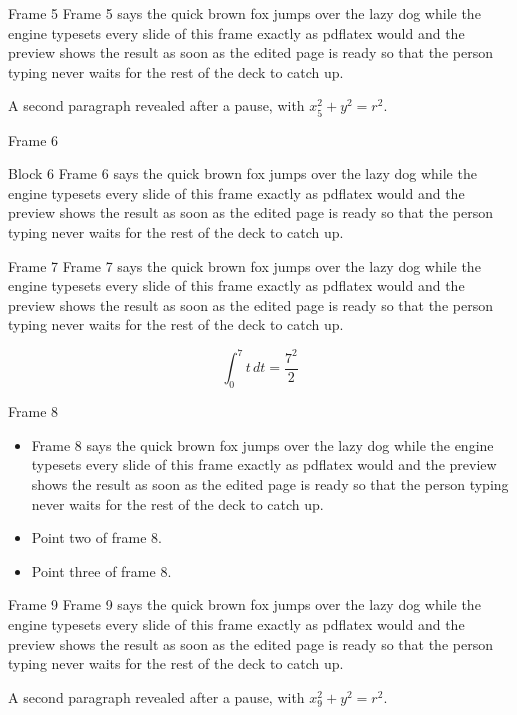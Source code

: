 \documentclass{beamer}
\begin{document}
\begin{frame}{Frame 5}
  Frame 5 says the quick brown fox jumps over the lazy dog while the engine typesets every slide of this frame exactly as pdflatex would and the preview shows the result as soon as the edited page is ready so that the person typing never waits for the rest of the deck to catch up.
  \pause

  A second paragraph revealed after a pause, with $x_{5}^2 + y^2 = r^2$.
\end{frame}
\begin{frame}{Frame 6}
  \begin{block}{Block 6}
    Frame 6 says the quick brown fox jumps over the lazy dog while the engine typesets every slide of this frame exactly as pdflatex would and the preview shows the result as soon as the edited page is ready so that the person typing never waits for the rest of the deck to catch up.
  \end{block}
\end{frame}
\begin{frame}{Frame 7}
  Frame 7 says the quick brown fox jumps over the lazy dog while the engine typesets every slide of this frame exactly as pdflatex would and the preview shows the result as soon as the edited page is ready so that the person typing never waits for the rest of the deck to catch up.

  \[ \int_0^{7} t\,dt = \frac{7^2}{2} \]
\end{frame}
\begin{frame}{Frame 8}
  \begin{itemize}
    \item<1-> Frame 8 says the quick brown fox jumps over the lazy dog while the engine typesets every slide of this frame exactly as pdflatex would and the preview shows the result as soon as the edited page is ready so that the person typing never waits for the rest of the deck to catch up.
    \item<2-> Point two of frame 8.
    \item<3-> Point three of frame 8.
  \end{itemize}
\end{frame}
\begin{frame}{Frame 9}
  Frame 9 says the quick brown fox jumps over the lazy dog while the engine typesets every slide of this frame exactly as pdflatex would and the preview shows the result as soon as the edited page is ready so that the person typing never waits for the rest of the deck to catch up.
  \pause

  A second paragraph revealed after a pause, with $x_{9}^2 + y^2 = r^2$.
\end{frame}
\end{document}
